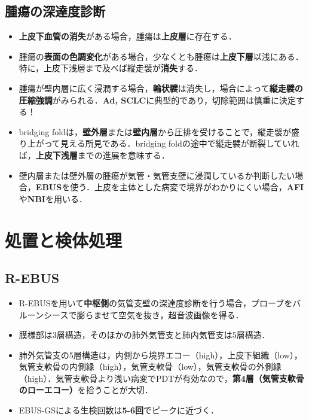 \subsection{腫瘍の深達度診断}
\begin{itemize}


\item \textbf{上皮下血管の消失}がある場合，腫瘍は\textbf{上皮層}に存在する．
\item 腫瘍の\textbf{表面の色調変化}がある場合，少なくとも腫瘍は\textbf{上皮下層}以浅にある．特に，上皮下浅層まで及べば縦走襞が\textbf{消失}する．
\item 腫瘍が壁内層に広く浸潤する場合，\textbf{輪状襞}は消失し，場合によって\textbf{縦走襞の圧縮強調}がみられる．\textbf{Ad, SCLC}に典型的であり，切除範囲は慎重に決定する！

\item bridging foldは，\textbf{壁外層}または\textbf{壁内層}から圧排を受けることで，縦走襞が盛り上がって見える所見である．bridging foldの途中で縦走襞が断裂していれば，\textbf{上皮下浅層}までの進展を意味する．

\item 壁内層または壁外層の腫瘍が気管・気管支壁に浸潤しているか判断したい場合，\textbf{EBUS}を使う．上皮を主体とした病変で境界がわかりにくい場合，\textbf{AFI}や\textbf{NBI}を用いる．


\end{itemize}

\section{処置と検体処理}
\subsection{R-EBUS}

\begin{itemize}
\item R-EBUSを用いて\textbf{中枢側}の気管支壁の深達度診断を行う場合，プローブをバルーンシースで膨らませて空気を抜き，超音波画像を得る．
\item 膜様部は3層構造，そのほかの肺外気管支と肺内気管支は5層構造．
\item 肺外気管支の5層構造は，内側から境界エコー（high），上皮下組織（low），気管支軟骨の内側縁（high），気管支軟骨（low），気管支軟骨の外側縁（high）．気管支軟骨より浅い病変でPDTが有効なので，\textbf{第4層（気管支軟骨のローエコー）}を拾うことが大切．
\item EBUS-GSによる生検回数は\textbf{5-6回}でピークに近づく．
\end{itemize}

